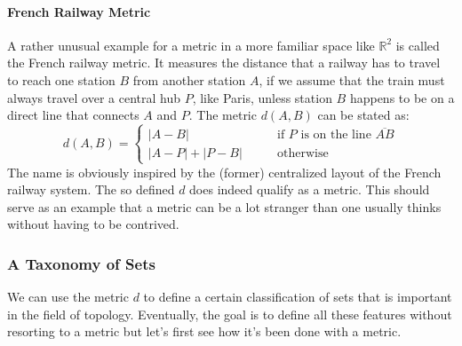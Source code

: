 
\paragraph{French Railway Metric}
A rather unusual example for a metric in a more familiar space like $\mathbb{R}^2$ is called the French railway metric. It measures the distance that a railway has to travel to reach one station $B$ from another station $A$, if we assume that the train must always travel over a central hub $P$, like Paris, unless station $B$ happens to be on a direct line that connects $A$ and $P$. The metric $d(A,B)$ can be stated as:
\begin{equation}
d(A,B) =
\begin{cases}
|A-B|          & \qquad \text{if $P$ is on the line $\overline{AB}$} \\
|A-P| + |P-B|  & \qquad \text{otherwise} 
\end{cases}
\end{equation}
The name is obviously inspired by the (former) centralized layout of the French railway system. The so defined $d$ does indeed qualify as a metric. This should serve as an example that a metric can be a lot stranger than one usually thinks without having to be contrived.






\subsubsection{A Taxonomy of Sets}
We can use the metric $d$ to define a certain classification of sets that is important in the field of topology. Eventually, the goal is to define all these features without resorting to a metric but let's first see how it's been done with a metric.

